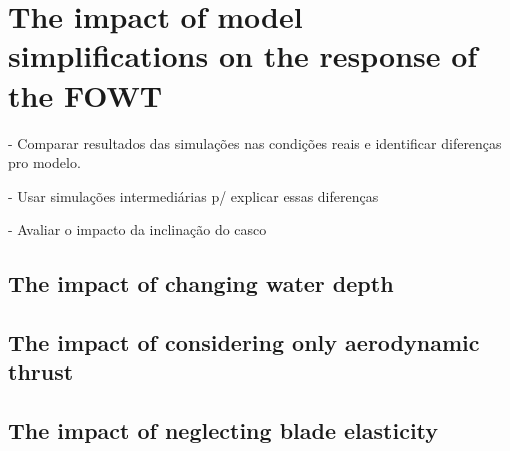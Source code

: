 \section{The impact of model simplifications on the response of the FOWT} \label{sec:impact_simplifications}
- Comparar resultados das simulações nas condições reais e identificar diferenças pro modelo.

- Usar simulações intermediárias p/ explicar essas diferenças

- Avaliar o impacto da inclinação do casco

\subsection{The impact of changing water depth}

\subsection{The impact of considering only aerodynamic thrust}

\subsection{The impact of neglecting blade elasticity}
